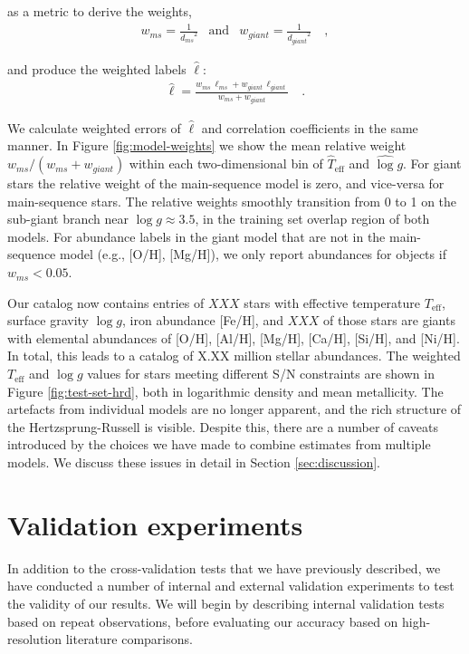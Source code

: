 \documentclass[preprint,trackchanges]{aastex}
\newcommand{\teff}{T_{\mathrm{eff}}}
\newcommand{\logg}{\log g}
\begin{document}
\noindent{}as a metric to derive the weights,
\begin{eqnarray}
	w_{ms} = \frac{1}{{d_{ms}}^2} & \text{and} & w_{giant} = \frac{1}{{d_{giant}}^2} \quad ,
\end{eqnarray}

\noindent{}and produce the weighted labels $\hat\ell$:
\begin{eqnarray}
	\hat\ell = \frac{w_{ms}\,\ell_{ms} + w_{giant}\,\ell_{giant}}{w_{ms} + w_{giant}} \quad .
\end{eqnarray}

We calculate weighted errors of $\hat\ell$ and correlation coefficients in 
the same manner.  In Figure \ref{fig:model-weights} we show the mean relative
weight $w_{ms}/(w_{ms} + w_{giant})$ within each two-dimensional bin of 
$\hat\teff$ and $\hat\logg$.  For giant stars the relative weight of 
the main-sequence model is zero, and vice-versa for main-sequence stars.
The relative weights smoothly transition from 0 to 1 on the sub-giant branch
near $\log{g} \approx 3.5$, in the training set overlap region of both models.
For abundance labels in the giant model that are not in the main-sequence
model (e.g., [O/H], [Mg/H]), we only report abundances for objects if
$w_{ms} < 0.05$.


Our catalog now contains entries of $XXX$ stars with effective temperature $\teff$,
surface gravity $\logg$, iron abundance [Fe/H], and $XXX$ of those stars are giants
with elemental abundances of [O/H], [Al/H], [Mg/H], [Ca/H], [Si/H], and [Ni/H].
In total, this leads to a catalog of X.XX million stellar abundances. 
The weighted $\teff$ and $\logg$ values for stars meeting different
S/N constraints are shown in Figure \ref{fig:test-set-hrd}, both in logarithmic density
and mean metallicity.  The artefacts from individual models are no longer 
apparent, and the rich structure of the Hertzsprung-Russell is visible.  Despite
this, there are a number of caveats introduced by the choices we have made to
combine estimates from multiple models. We discuss these issues in detail in
Section \ref{sec:discussion}.


\section{Validation experiments}
\label{sec:validation}


In addition to the cross-validation tests that we have previously described, 
we have conducted a number of internal and external validation experiments to 
test the validity of our results.  We will begin by describing internal validation
tests based on repeat observations, before evaluating our accuracy based on
high-resolution literature comparisons.
\end{document}
